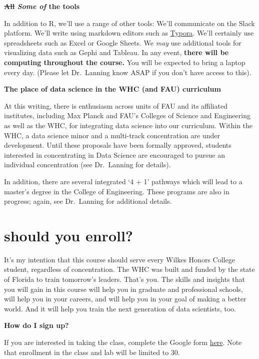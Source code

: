 \documentclass[openany]{book}
\begin{document}
\textbf{\sout{All} \emph{Some of} the tools}

In addition to R, we'll use a range of other tools: We'll communicate on the Slack platform. We'll write using markdown editors such as \href{https://typora.io/}{Typora}. We'll certainly use spreadsheets such as Excel or Google Sheets. We \emph{may} use additional tools for visualizing data such as Gephi and Tableau. In any event, \textbf{there will be computing throughout the course.} You will be expected to bring a laptop every day. (Please let Dr.~Lanning know ASAP if you don't have access to this).

\textbf{The place of data science in the WHC (and FAU) curriculum}

At this writing, there is enthusiasm across units of FAU and its affiliated institutes, including Max Planck and FAU's Colleges of Science and Engineering as well as the WHC, for integrating data science into our curriculum. Within the WHC, a data science minor and a multi-track concentration are under development. Until these proposals have been formally approved, students interested in concentrating in Data Science are encouraged to pursue an individual concentration (see Dr.~Lanning for details).

In addition, there are several integrated `4 + 1' pathways which will lead to a master's degree in the College of Engineering. These programs are also in progress; again, see Dr.~Lanning for additional details.

\hypertarget{should-you-enroll}{%
\section*{should you enroll?}\label{should-you-enroll}}

It's my intention that this course should serve every Wilkes Honors College student, regardless of concentration. The WHC was built and funded by the state of Florida to train tomorrow's leaders. That's you. The skills and insights that you will gain in this course will help you in graduate and professional schools, will help you in your careers, and will help you in your goal of making a better world. And it will help you train the next generation of data scientists, too.

\textbf{How do I sign up?}

If you are interested in taking the class, complete the Google form \href{https://goo.gl/forms/kXGAOTShcOLPwjPH2}{here}. Note that enrollment in the class and lab will be limited to 30.
\end{document}
